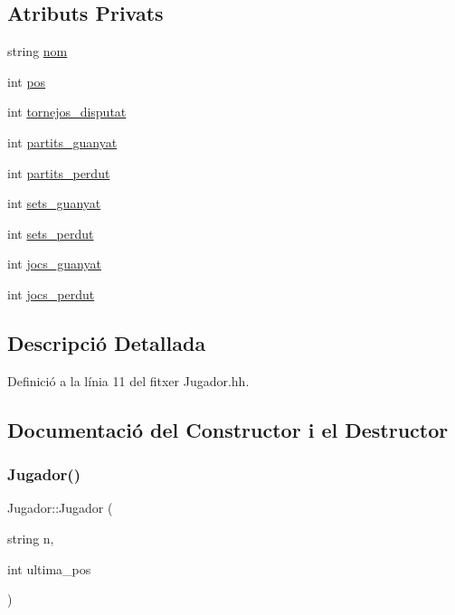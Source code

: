 \subsection*{Atributs Privats}
\begin{DoxyCompactItemize}
\item 
string \mbox{\hyperlink{class_jugador_afd6bec98df8ebb3d2db3ef583a76cfa1}{nom}}
\item 
int \mbox{\hyperlink{class_jugador_a25a7eeb0d334b2fe60bb490704c6626d}{pos}}
\item 
int \mbox{\hyperlink{class_jugador_a2ef0821abd64385a58561b039c37a469}{tornejos\+\_\+disputat}}
\item 
int \mbox{\hyperlink{class_jugador_a6bf9a674be86bfce7945f7c0dfbe531f}{partits\+\_\+guanyat}}
\item 
int \mbox{\hyperlink{class_jugador_ad1e6a56bea30a1449dbb37871c288fcf}{partits\+\_\+perdut}}
\item 
int \mbox{\hyperlink{class_jugador_a396b226c722425d387f36e239fc9855c}{sets\+\_\+guanyat}}
\item 
int \mbox{\hyperlink{class_jugador_a7c9fcb3ec52c2c400e7cf8faaf945426}{sets\+\_\+perdut}}
\item 
int \mbox{\hyperlink{class_jugador_a0eb97835e7dd3143f626c1d15edb7392}{jocs\+\_\+guanyat}}
\item 
int \mbox{\hyperlink{class_jugador_a04e5cf90e57c490b4c088e29763479f7}{jocs\+\_\+perdut}}
\end{DoxyCompactItemize}


\subsection{Descripció Detallada}


Definició a la línia 11 del fitxer Jugador.\+hh.



\subsection{Documentació del Constructor i el Destructor}
\mbox{\label{class_jugador_a0bac6ebd78bbdc5ed61be887a163ecc0}} 
\subsubsection{\texorpdfstring{Jugador()}{Jugador()}}
{\footnotesize\ttfamily Jugador\+::\+Jugador (\begin{DoxyParamCaption}\item[{string}]{n,  }\item[{int}]{ultima\+\_\+pos }\end{DoxyParamCaption})}



